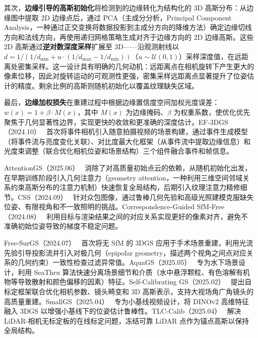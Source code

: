 其次，\textbf{边缘引导的高斯初始化}将检测到的边缘转化为结构化的 3D 高斯分布：从边缘图中提取 2D 边缘点后，通过 PCA（主成分分析，Principal Component Analysis，一种通过正交变换将数据投影到主成分方向的降维方法）确定边缘切线方向和法线方向，再使用递归网格策略生成对齐于边缘方向的 2D 边缘高斯。这些 2D 高斯通过\textbf{逆对数深度采样}扩展至 3D——沿观测射线以 $d = 1/(1/d_{\min} + u \cdot (1/d_{\max} - 1/d_{\min}))$（$u \sim \mathcal{U}(0,1)$）采样深度值，在远距离处密集采样。这一设计具有明确的几何动机：远距离点在相机旋转下产生更大的像素位移，因此对旋转运动的可观测性更强，密集采样远距离点显著提升了位姿估计的精度。剩余比例的高斯则随机初始化以覆盖纹理缺失区域。

最后，\textbf{边缘加权损失}在重建过程中根据边缘置信度空间加权光度误差：$w(x) = 1 + \beta \cdot M(x)$，其中 $M(x)$ 为边缘掩码、$\beta$ 为权重系数，使优化优先聚焦于几何显著性边界，实现更快的收敛和更准确的深度估计。EF-3DGS（2024.10）~\cite{2410_15392} 首次将事件相机引入随意拍摄视频的场景构建，通过事件生成模型（将事件流与亮度变化关联）、对比度最大化框架（从事件流中提取边缘信息）和光度束调整（联合优化相机位姿和场景结构）三个组件融合事件和帧信息。

AttentionGS（2025.06）~\cite{2506_23611} 消除了对高质量初始点云的依赖，从随机初始化出发，在早期训练阶段引入几何注意力（geometry attention，一种利用三维空间邻域关系约束高斯分布的注意力机制）快速恢复全局结构，后期引入纹理注意力精修细节。CSS（2024.09）~\cite{2409_08562} 针对众包图像，通过鲁棒几何先验和高级光照建模克服缺失位姿、有限视角和不一致照明的挑战。Correspondence-Guided SfM-Free（2024.08）~\cite{2408_08723} 利用目标与渲染结果之间的对应关系实现更好的像素对齐，避免不准确初始位姿导致的梯度不稳定问题。

Free-SurGS（2024.07）~\cite{2407_02918} 首次将无 SfM 的 3DGS 应用于手术场景重建，利用光流先验引导投影流并引入对极几何（epipolar geometry，描述两个视角之间点对应关系的几何约束）一致性检查过滤异常值。AquaGS（2025.05）~\cite{2505_01799} 专为水下场景设计，利用 SeaThru 算法快速分离场景细节和介质（水中悬浮颗粒、有色溶解有机物等导致散射和颜色偏移的因素）特征。Self-Calibrating GS（2025.02）~\cite{2502_09563} 提出自标定框架联合优化相机参数、镜头畸变和 3D 高斯表示，支持大视场角广角镜头的高质量重建。SmallGS（2025.04）~\cite{2504_17810} 专为小基线视频设计，将 DINOv2 高维特征融入 3DGS 以增强小基线下的位姿估计鲁棒性。TLC-Calib（2025.04）~\cite{2504_04597} 解决 LiDAR-相机无标定板的在线标定问题，冻结可靠 LiDAR 点作为锚点高斯以保持全局结构。

